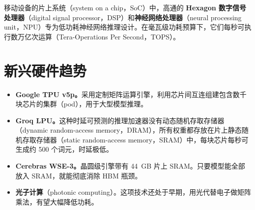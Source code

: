 移动设备的片上系统（system on a chip，SoC）中，高通的 \textbf{Hexagon 数字信号处理器}（digital signal processor，DSP）和\textbf{神经网络处理器}（neural processing unit，NPU）专为低功耗神经网络推理设计。在毫瓦级功耗预算下，它们每秒可执行数万亿次运算（Tera-Operations Per Second，TOPS）。

\section{新兴硬件趋势}

\begin{itemize}
  \item \textbf{Google TPU v5p。}采用定制矩阵运算引擎，利用芯片间互连组建包含数千块芯片的集群（pod），用于大型模型推理。
  \item \textbf{Groq LPU。}这种时延可预测的推理加速器没有动态随机存取存储器（dynamic random-access memory，DRAM），所有权重都存放在片上静态随机存取存储器（static random-access memory，SRAM）中，每块芯片每秒可生成约 500 个词元，时延极低。
  \item \textbf{Cerebras WSE-3。}晶圆级引擎带有 44~GB 片上 SRAM。只要模型能全部放入 SRAM，就能彻底消除 HBM 瓶颈。
  \item \textbf{光子计算}（photonic computing）。这项技术还处于早期，用光代替电子做矩阵乘法，有望大幅降低功耗。
\end{itemize}

